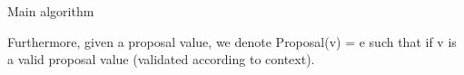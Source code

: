 \documentclass[10pt,a4paper]{article}
\begin{document}
\begin{section}{Main algorithm}

Furthermore, given a proposal value, we denote Proposal(v) = e such that if v is a valid proposal value
(validated according to context).











\end{section}
\end{document}
